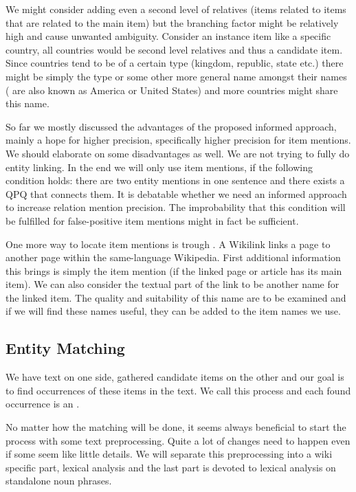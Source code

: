 We might consider adding even a second level of relatives (items related to items that are related to the main item) but the branching factor might be relatively high and cause unwanted ambiguity. Consider an instance item like a specific country, all countries would be second level relatives and thus a candidate item. Since countries tend to be of a certain type (kingdom, republic, state etc.) there might be simply the type or some other more general name amongst their names ( are also known as America or United States) and more countries might share this name.

So far we mostly discussed the advantages of the proposed informed approach, mainly a hope for higher precision, specifically higher precision for item mentions. We should elaborate on some disadvantages as well. We are not trying to fully do entity linking. In the end we will only use item mentions, if the following condition holds: there are two entity mentions in one sentence and there exists a QPQ that connects them. It is debatable whether we need an informed approach to increase relation mention precision. The improbability that this condition will be fulfilled for false-positive item mentions might in fact be sufficient.

One more way to locate item mentions is trough . A Wikilink links a page to another page within the same-language Wikipedia. First additional information this brings is simply the item mention (if the linked page or article has its main item). We can also consider the textual part of the link to be another name for the linked item. The quality and suitability of this name are to be examined and if we will find these names useful, they can be added to the item names we use.




\subsection{Entity Matching}

We have text on one side, gathered candidate items on the other and our goal is to find occurrences of these items in the text. We call this process  and each found occurrence is an .

No matter how the matching will be done, it seems always beneficial to start the process with some text preprocessing. Quite a lot of changes need to happen even if some seem like little details. We will separate this preprocessing into a wiki specific part, lexical analysis and the last part is devoted to lexical analysis on standalone noun phrases.

